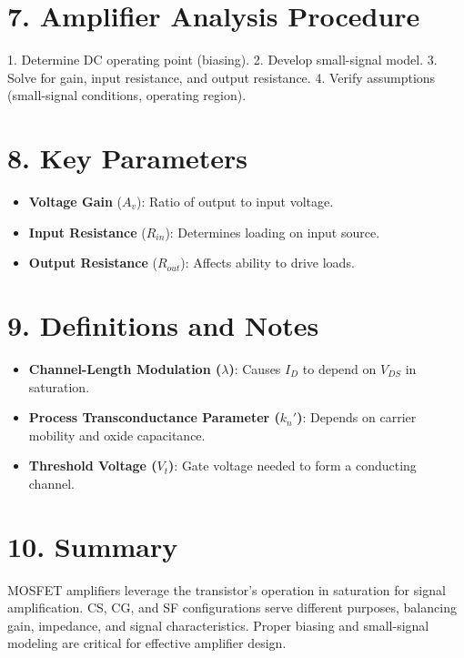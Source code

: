 \documentclass[10pt]{article}
\begin{document}
\begin{multicols}{2}
\section*{7. Amplifier Analysis Procedure}
1. Determine DC operating point (biasing).  
2. Develop small-signal model.  
3. Solve for gain, input resistance, and output resistance.  
4. Verify assumptions (small-signal conditions, operating region).

\section*{8. Key Parameters}
\begin{itemize}[noitemsep]
    \item \textbf{Voltage Gain} (\(A_v\)): Ratio of output to input voltage.
    \item \textbf{Input Resistance} (\(R_{in}\)): Determines loading on input source.
    \item \textbf{Output Resistance} (\(R_{out}\)): Affects ability to drive loads.
\end{itemize}

\section*{9. Definitions and Notes}
\begin{itemize}[noitemsep]
    \item \textbf{Channel-Length Modulation (\(\lambda\))}: Causes \(I_D\) to depend on \(V_{DS}\) in saturation.
    \item \textbf{Process Transconductance Parameter (\(k_n'\))}: Depends on carrier mobility and oxide capacitance.
    \item \textbf{Threshold Voltage (\(V_t\))}: Gate voltage needed to form a conducting channel.
\end{itemize}

\section*{10. Summary}
MOSFET amplifiers leverage the transistor's operation in saturation for signal amplification. CS, CG, and SF configurations serve different purposes, balancing gain, impedance, and signal characteristics. Proper biasing and small-signal modeling are critical for effective amplifier design.

\end{multicols}
\end{document}
